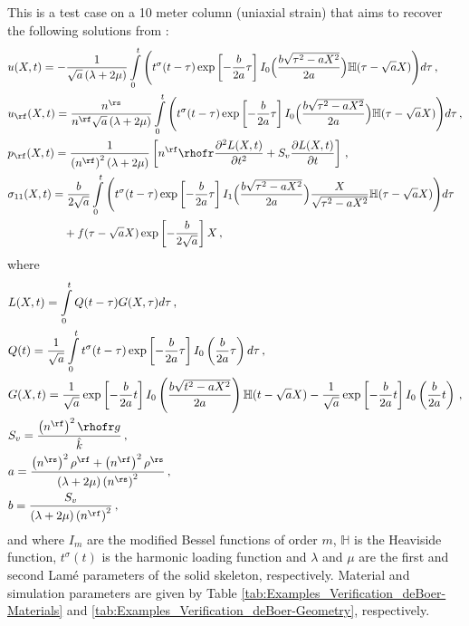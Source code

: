 This is a test case on a 10 meter column (uniaxial strain) that aims to recover the following solutions from \citet{deBoer1993}:
{\scriptsize
\begin{align}
\label{eq:Examples_Verification_deBoer_Solutions}
  \begin{aligned}
    &u(X,t) = -\frac{1}{\sqrt{a}\left(\lambda + 2\mu\right)}\int\limits_0^t\Bigg(t^\sigma(t-\tau)\exp\left[-\frac{b}{2a}\tau\right]I_0\Big(\frac{b\sqrt{\tau^2 - aX^2}}{2a}\Big)\mathbb{H}(\tau-\sqrt{a}X)\Bigg)d\tau\, ,\\
    &u_\rf(X,t) = \frac{n^\rs}{n^\rf\sqrt{a}\left(\lambda + 2\mu\right)}\int\limits_0^t\Bigg(t^\sigma(t-\tau)\exp\left[-\frac{b}{2a}\tau\right]I_0\Big(\frac{b\sqrt{\tau^2 - aX^2}}{2a}\Big)\mathbb{H}(\tau-\sqrt{a}X)\Bigg)d\tau\, ,\\
    &p_\rf(X,t) = \frac{1}{\left(n^\rf\right)^2\left(\lambda + 2\mu\right)}\left[n^\rf\rhofr\frac{\partial^2L(X,t)}{\partial t^2} + S_v\frac{\partial L(X,t)}{\partial t}\right]\, ,\\
    &\sigma_{11}(X,t) = \frac{b}{2\sqrt{a}}\int\limits_0^t\Bigg(t^\sigma(t-\tau)\exp\left[-\frac{b}{2a}\tau\right]I_1\Big(\frac{b\sqrt{\tau^2 - aX^2}}{2a}\Big)\frac{X}{\sqrt{\tau^2-aX^2}}\mathbb{H}(\tau-\sqrt{a}X)\Bigg)d\tau\\
     &\phantom{\sigma_{11}(X,t) =}+ f(\tau-\sqrt{a}X)\exp\left[-\frac{b}{2\sqrt{a}}\right]X\, ,
  \end{aligned}
\end{align}}%
where
{\scriptsize
\begin{align}
\label{eq:Examples_Verification_deBoer_Definitions}
  \begin{aligned}
    &L(X,t) = \int\limits_0^tQ(t-\tau)G(X,\tau)d\tau\, ,\\
    &Q(t) = \frac{1}{\sqrt{a}}\int\limits_0^tt^\sigma(t-\tau)\exp\left[-\frac{b}{2a}\tau\right]I_0\left(\frac{b}{2a}\tau\right)d\tau\, ,\\
    &G(X,t) = \frac{1}{\sqrt{a}}\exp\left[-\frac{b}{2a}t\right]I_0\left(\frac{b\sqrt{t^2-aX^2}}{2a}\right)\mathbb{H}(t-\sqrt{a}X) - \frac{1}{\sqrt{a}}\exp\left[-\frac{b}{2a}t\right]I_0\left(\frac{b}{2a}t\right)\, ,\\
    &S_v = \frac{\left(n^\rf\right)^2\rhofr g}{\hat{k}}\, ,\\
    &a = \frac{\left(n^\rs\right)^2\rho^\rf + \left(n^\rf\right)^2\rho^\rs}{\left(\lambda + 2\mu\right)\left(n^\rs\right)^2}\, ,\\
    &b = \frac{S_v}{\left(\lambda + 2\mu\right)\left(n^\rf\right)^2}\, ,
  \end{aligned}
\end{align}}%
and where $I_m$ are the modified Bessel functions of order $m$, $\mathbb{H}$ is the Heaviside function, $t^\sigma(t)$ is the harmonic loading function and $\lambda$ and $\mu$ are the first and second Lam\'{e} parameters of the solid skeleton, respectively. Material and simulation parameters are given by Table \ref{tab:Examples_Verification_deBoer-Materials} and \ref{tab:Examples_Verification_deBoer-Geometry}, respectively.

